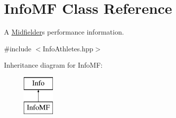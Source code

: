\hypertarget{class_info_m_f}{}\section{Info\+MF Class Reference}
\label{class_info_m_f}


A \hyperlink{class_midfielder}{Midfielder}\textquotesingle{}s performance information.  




{\ttfamily \#include $<$Info\+Athletes.\+hpp$>$}

Inheritance diagram for Info\+MF\+:\begin{figure}[H]
\begin{center}
\leavevmode
\includegraphics[height=2.000000cm]{class_info_m_f}
\end{center}
\end{figure}
